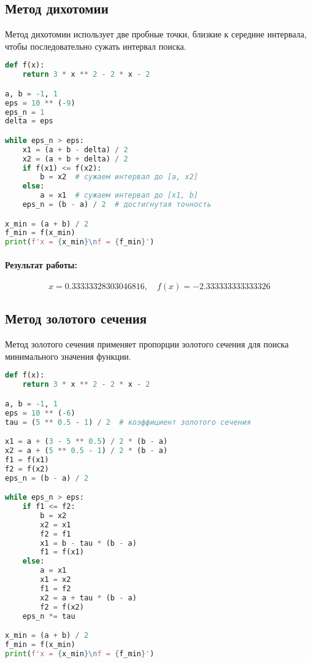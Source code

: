\documentclass[a4paper,12pt]{article}
\begin{document}
\subsection*{Метод дихотомии}
Метод дихотомии использует две пробные точки, близкие к середине интервала, чтобы последовательно сужать интервал поиска.

\begin{lstlisting}[language=Python, caption=Метод дихотомии]
def f(x):
    return 3 * x ** 2 - 2 * x - 2

a, b = -1, 1
eps = 10 ** (-9)
eps_n = 1
delta = eps

while eps_n > eps:
    x1 = (a + b - delta) / 2
    x2 = (a + b + delta) / 2
    if f(x1) <= f(x2):
        b = x2  # сужаем интервал до [a, x2]
    else:
        a = x1  # сужаем интервал до [x1, b]
    eps_n = (b - a) / 2  # достигнутая точность

x_min = (a + b) / 2
f_min = f(x_min)
print(f'x = {x_min}\nf = {f_min}')
\end{lstlisting}

\paragraph{Результат работы:}
\[ 
x = 0.33333328303046816, \quad f(x) = -2.333333333333326 
\]

\subsection*{Метод золотого сечения}
Метод золотого сечения применяет пропорции золотого сечения для поиска минимального значения функции.

\begin{lstlisting}[language=Python, caption=Метод золотого сечения]
def f(x):
    return 3 * x ** 2 - 2 * x - 2

a, b = -1, 1
eps = 10 ** (-6)
tau = (5 ** 0.5 - 1) / 2  # коэффициент золотого сечения

x1 = a + (3 - 5 ** 0.5) / 2 * (b - a)
x2 = a + (5 ** 0.5 - 1) / 2 * (b - a)
f1 = f(x1)
f2 = f(x2)
eps_n = (b - a) / 2

while eps_n > eps:
    if f1 <= f2:
        b = x2
        x2 = x1
        f2 = f1
        x1 = b - tau * (b - a)
        f1 = f(x1)
    else:
        a = x1
        x1 = x2
        f1 = f2
        x2 = a + tau * (b - a)
        f2 = f(x2)
    eps_n *= tau

x_min = (a + b) / 2
f_min = f(x_min)
print(f'x = {x_min}\nf = {f_min}')
\end{lstlisting}
\end{document}
